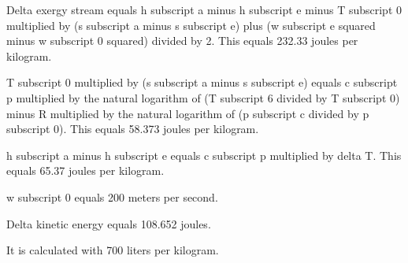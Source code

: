 Delta exergy stream equals h subscript a minus h subscript e minus T subscript 0 multiplied by (s subscript a minus s subscript e) plus (w subscript e squared minus w subscript 0 squared) divided by 2. This equals 232.33 joules per kilogram.  

T subscript 0 multiplied by (s subscript a minus s subscript e) equals c subscript p multiplied by the natural logarithm of (T subscript 6 divided by T subscript 0) minus R multiplied by the natural logarithm of (p subscript c divided by p subscript 0). This equals 58.373 joules per kilogram.  

h subscript a minus h subscript e equals c subscript p multiplied by delta T. This equals 65.37 joules per kilogram.  

w subscript 0 equals 200 meters per second.  

Delta kinetic energy equals 108.652 joules.  

It is calculated with 700 liters per kilogram.